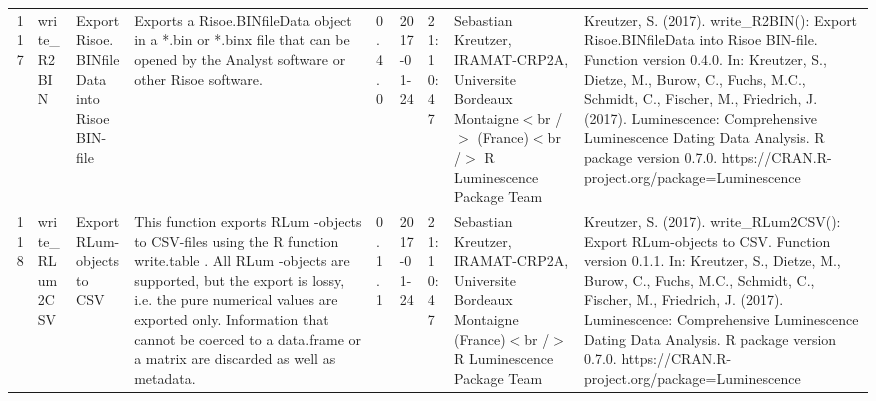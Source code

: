 \begin{table}[ht]
\begin{tabular}{rllllllll}
 \\ 
  117 & write\_R2BIN & Export Risoe.BINfileData into Risoe BIN-file & Exports a Risoe.BINfileData object in a *.bin or *.binx file that can be opened by the Analyst software or other Risoe software. & 0.4.0 & 2017-01-24 & 21:10:47
 & Sebastian Kreutzer, IRAMAT-CRP2A, Universite Bordeaux Montaigne$<$br /$>$ (France)$<$br /$>$  R Luminescence Package Team & Kreutzer, S. (2017). write\_R2BIN(): Export Risoe.BINfileData into Risoe BIN-file. Function version 0.4.0. In: Kreutzer, S., Dietze, M., Burow, C., Fuchs, M.C., Schmidt, C., Fischer, M., Friedrich, J. (2017). Luminescence: Comprehensive Luminescence Dating Data Analysis. R package version 0.7.0. https://CRAN.R-project.org/package=Luminescence
 \\ 
  118 & write\_RLum2CSV & Export RLum-objects to CSV & This function exports  RLum -objects to CSV-files using the R function write.table . All  RLum -objects are supported, but the export is lossy, i.e. the pure numerical values are exported only. Information that cannot be coerced to a  data.frame  or a  matrix  are discarded as well as metadata. & 0.1.1 & 2017-01-24 & 21:10:47
 & Sebastian Kreutzer, IRAMAT-CRP2A, Universite Bordeaux Montaigne (France)$<$br /$>$  R Luminescence Package Team & Kreutzer, S. (2017). write\_RLum2CSV(): Export RLum-objects to CSV. Function version 0.1.1. In: Kreutzer, S., Dietze, M., Burow, C., Fuchs, M.C., Schmidt, C., Fischer, M., Friedrich, J. (2017). Luminescence: Comprehensive Luminescence Dating Data Analysis. R package version 0.7.0. https://CRAN.R-project.org/package=Luminescence
 \\ 
   \hline
\end{tabular}
\end{table}

